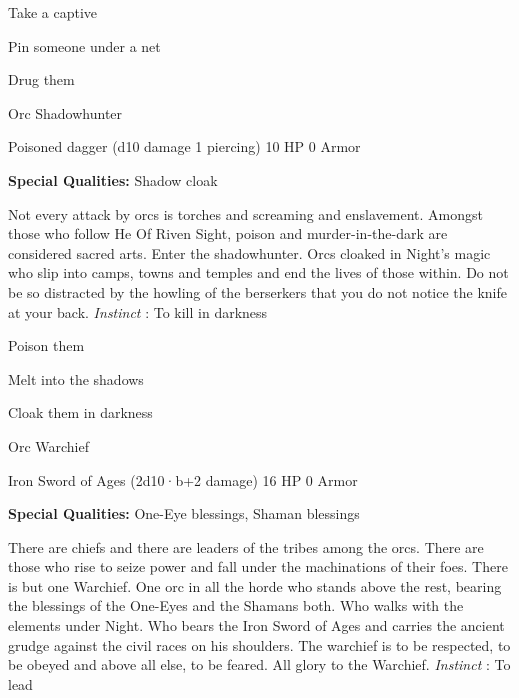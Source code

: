 \startitemize[1,packed]

\item Take a captive

 
\item Pin someone under a net

 
\item Drug them


\stopitemize
 
\startMonsterName
Orc Shadowhunter	 
\stopMonsterName
 

Poisoned dagger (d10 damage 1 piercing)	10 HP	0 Armor

 


 
\startMonsterQualities
{\bf Special Qualities:}  Shadow cloak
\stopMonsterQualities
 
\startMonsterDescription
Not every attack by orcs is torches and screaming and enslavement. Amongst those who follow He Of Riven Sight, poison and murder-in-the-dark are considered sacred arts. Enter the shadowhunter. Orcs cloaked in Night’s magic who slip into camps, towns and temples and end the lives of those within. Do not be so distracted by the howling of the berserkers that you do not notice the knife at your back. {\em Instinct} : To kill in darkness
\stopMonsterDescription
 
\startitemize[1,packed]

\item Poison them

 
\item Melt into the shadows

 
\item Cloak them in darkness


\stopitemize
 
\startMonsterName
Orc Warchief	 
\stopMonsterName
 

Iron Sword of Ages (2d10·b+2 damage)	16 HP	0 Armor

 


 
\startMonsterQualities
{\bf Special Qualities:}  One-Eye blessings, Shaman blessings
\stopMonsterQualities
 
\startMonsterDescription
There are chiefs and there are leaders of the tribes among the orcs. There are those who rise to seize power and fall under the machinations of their foes. There is but one Warchief. One orc in all the horde who stands above the rest, bearing the blessings of the One-Eyes and the Shamans both. Who walks with the elements under Night. Who bears the Iron Sword of Ages and carries the ancient grudge against the civil races on his shoulders. The warchief is to be respected, to be obeyed and above all else, to be feared. All glory to the Warchief. {\em Instinct} : To lead
\stopMonsterDescription
 
